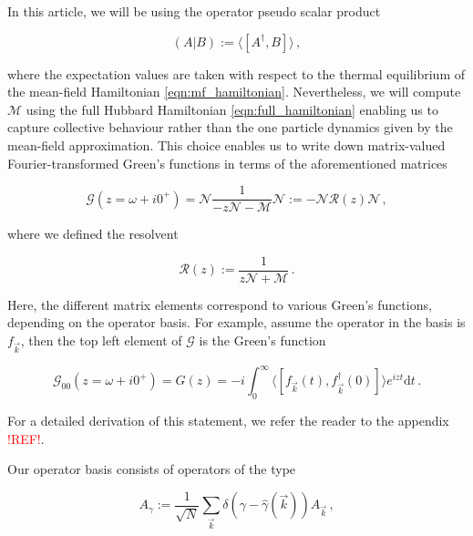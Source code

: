 \documentclass[
    reprint, 
    aps,
    preprintnumbers,
    twocolumn,
    prb,
    superscriptaddress
]{revtex4-2}
\newcommand{\vk}{\vec{k}}
\begin{document}
In this article, we will be using the operator pseudo scalar product

\begin{equation}
\label{eqn:scalar_product}
    (A | B) := \langle [A^\dagger, B] \rangle\,,
\end{equation}

where the expectation values are taken with respect to the thermal equilibrium of the mean-field Hamiltonian \eqref{eqn:mf_hamiltonian}.
Nevertheless, we will compute $\mathcal{M}$ using the full Hubbard Hamiltonian \eqref{eqn:full_hamiltonian} enabling us to capture collective behaviour rather than the one particle dynamics given by the mean-field approximation.
\newline
This choice enables us to write down matrix-valued Fourier-transformed Green's functions in terms of the aforementioned matrices

\begin{equation}
    \label{eqn:green_function}
    \mathcal{G}(z = \omega + i0^+) = \mathcal{N} \frac{1}{-z \mathcal{N} - \mathcal{M}} \mathcal{N} := -\mathcal{N} \mathcal{R}(z) \mathcal{N}\,,
\end{equation}

where we defined the resolvent

\begin{equation}
    \label{eqn:resolvent}
    \mathcal{R}(z) := \frac{1}{z \mathcal{N} + \mathcal{M}}\,.
\end{equation}

Here, the different matrix elements correspond to various Green's functions, depending on the operator basis.
For example, assume the operator in the basis is $f_{\vk}$, then the top left element of $\mathcal{G}$ is the Green's function 

\begin{equation}
    \mathcal{G}_{00}(z = \omega +i0^+) =  G(z) = -i \int_0^{\infty} \langle [f_{\vk}(t), f_{\vk}^\dagger(0)] \rangle e^{izt} \mathrm{d}t\,.
\end{equation}

For a detailed derivation of this statement, we refer the reader to the appendix \textcolor{red}{!REF!}.

Our operator basis consists of operators of the type

\begin{equation}
    A_\gamma := \frac{1}{\sqrt{N}} \sum_{\vk} \delta (\gamma - \hat{\gamma}( \vk )) A_{\vk}\,,
\end{equation}
\end{document}
